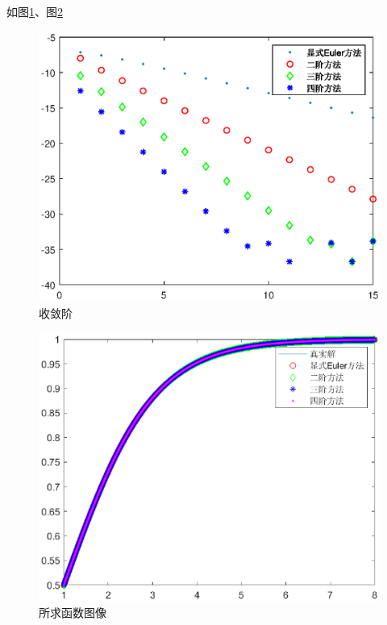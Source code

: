 \documentclass{article}%
\begin{document}
如图\ref{Fig:5}、图\ref{Fig:6}

\begin{figure}
	\includegraphics[width=1\linewidth]{week4_6_1.eps}
	\caption{收敛阶}  
	\label{Fig:5}
\end{figure}

\begin{figure}
	\includegraphics[width=1\linewidth]{week4_6_2.eps}
	\caption{所求函数图像}  
	\label{Fig:6}
\end{figure}
\end{document}
